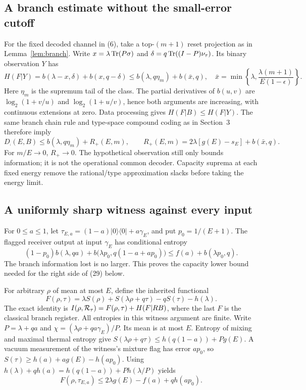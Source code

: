 \subsection{A branch estimate without the small-error cutoff}
For the fixed decoded channel in (6), take a top-\((m+1)\) reset
projection as in Lemma~\ref{lem:branch}. Write
\(x=\lambda\operatorname{Tr}(P\sigma)\) and
\(\delta=q\operatorname{Tr}((I-P)\nu_\tau)\). Its binary observation \(Y\) has
\[
 H(F|Y)=b(\lambda-x,\delta)+b(x,q-\delta)
 \le b(\lambda,q\eta_m)+b(\bar x,q),\quad
 \bar x=\min\left\{\lambda,
             \frac{\lambda(m+1)}{E(1-\epsilon)}\right\}.        \tag{27}
\]
Here \(\eta_m\) is the supremum tail of the class. The partial
derivatives of \(b(u,v)\) are \(\log_2(1+v/u)\) and
\(\log_2(1+u/v)\), hence both arguments are increasing, with continuous
extensions at zero. Data processing gives \(H(F|B)\le H(F|Y)\).
The same branch chain rule and type-space compound coding as in
Section~3 therefore imply
\[
 D_{\comp}(E,B)\le b(\lambda,q\eta_m)+R_+(E,m),\qquad
 R_+(E,m)=2\lambda[g(E)-s_E]+b(\bar x,q).                       \tag{28}
\]
For \(m/E\to0\), \(R_+\to0\). The hypothetical observation still only
bounds information; it is not the operational common decoder. Capacity
suprema at each fixed energy remove the rational/type approximation
slacks before taking the energy limit.

\subsection{A uniformly sharp witness against every input}
For \(0\le a\le1\), let \(\tau_{E,a}=(1-a)|0\rangle\langle0|+a\gamma_E\),
and put \(p_0=1/(E+1)\). The flagged receiver output at input \(\gamma_E\)
has conditional entropy
\[
 (1-p_0)b(\lambda,qa)+
 b\bigl(\lambda p_0,q(1-a+ap_0)\bigr)
 \le f(a)+b(\lambda p_0,q).
\]
The branch information lost is no larger. This proves the capacity
lower bound needed for the right side of (29) below.

For arbitrary \(\rho\) of mean at most \(E\), define the inherited functional
\[
 F(\rho,\tau)=\lambda S(\rho)+S(\lambda\rho+q\tau)
                         -qS(\tau)-h(\lambda).
\]
The exact identity is \(I(\rho,\mathcal R_\tau)=F(\rho,\tau)+H(F|RB)\),
where the last \(F\) is the classical branch register. All entropies
in this witness argument are finite.
Write \(P=\lambda+qa\) and \(\chi=(\lambda\rho+qa\gamma_E)/P\).
Its mean is at most \(E\). Entropy of mixing and maximal thermal entropy give
\(S(\lambda\rho+q\tau)\le h(q(1-a))+Pg(E)\).
A vacuum measurement of the witness's mixture flag has error \(ap_0\), so
\(S(\tau)\ge h(a)+ag(E)-h(ap_0)\).
Using
\(h(\lambda)+qh(a)=h(q(1-a))+P h(\lambda/P)\) yields
\[
 F(\rho,\tau_{E,a})\le2\lambda g(E)-f(a)+q h(ap_0).
\]

